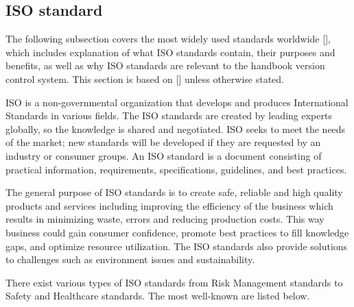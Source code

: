












\subsection{ISO standard}






The following subsection covers the most widely used standards worldwide [], which includes explanation of what ISO standards contain, their purposes and benefits, as well as why ISO standards are relevant to the handbook version control system. This section is based on [] unless otherwise stated.

ISO is a non-governmental organization that develops and produces International Standards in various fields. The ISO standards are created by leading experts globally, so the knowledge is shared and negotiated. ISO seeks to meet the needs of the market; new standards will be developed if they are requested by an industry or consumer groups. An ISO standard is a document consisting of practical information, requirements, specifications, guidelines, and best practices.

The general purpose of ISO standards is to create safe, reliable and high quality products and services including improving the efficiency of the business which results in minimizing waste, errors and reducing production costs. This way business could gain consumer confidence, promote best practices to fill knowledge gaps, and optimize resource utilization. The ISO standards also provide solutions to challenges such as environment issues and sustainability.

There exist various types of ISO standards from Risk Management standards to Safety and Healthcare standards. The most well-known are listed below.

